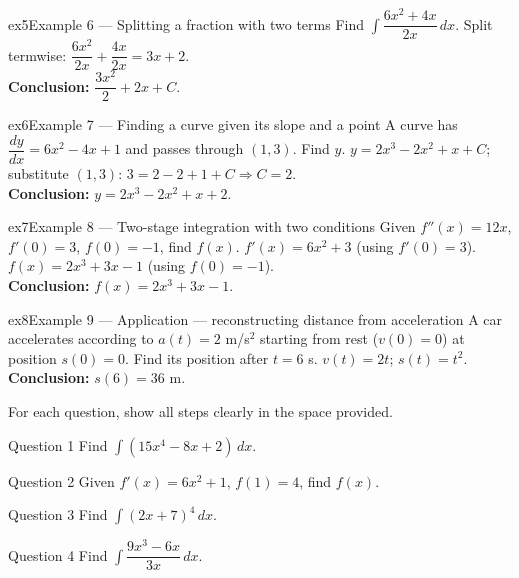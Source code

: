 \documentclass[11pt]{article}
\begin{document}
\begin{example}{ex5}{Example 6 --- Splitting a fraction with two terms}
Find $\displaystyle\int\dfrac{6x^2+4x}{2x}\,dx$.\soln
Split termwise: $\dfrac{6x^2}{2x}+\dfrac{4x}{2x}=3x+2$.\\[3pt]\textbf{Conclusion:} $\dfrac{3x^2}2+2x+C$.
\end{example}

\begin{example}{ex6}{Example 7 --- Finding a curve given its slope and a point}
A curve has $\dfrac{dy}{dx}=6x^2-4x+1$ and passes through $(1,3)$. Find $y$.\soln
$y=2x^3-2x^2+x+C$; substitute $(1,3)$: $3=2-2+1+C\Rightarrow C=2$.\\[3pt]\textbf{Conclusion:} $y=2x^3-2x^2+x+2$.
\end{example}

\begin{example}{ex7}{Example 8 --- Two-stage integration with two conditions}
Given $f''(x)=12x$, $f'(0)=3$, $f(0)=-1$, find $f(x)$.\soln
$f'(x)=6x^2+3$ (using $f'(0)=3$). $f(x)=2x^3+3x-1$ (using $f(0)=-1$).\\[3pt]\textbf{Conclusion:} $f(x)=2x^3+3x-1$.
\end{example}

\begin{example}{ex8}{Example 9 --- Application --- reconstructing distance from acceleration}
A car accelerates according to $a(t)=2$ m/s$^2$ starting from rest ($v(0)=0$) at position $s(0)=0$. Find its position after $t=6$ s.\soln
$v(t)=2t$; $s(t)=t^2$.\\[3pt]\textbf{Conclusion:} $s(6)=36$ m.
\end{example}

\clearpage
{}
For each question, show all steps clearly in the space provided.

\begin{qbox}{Question 1}
Find $\displaystyle\int(15x^4-8x+2)\,dx$.\workspace{2.4cm}
\end{qbox}

\begin{qbox}{Question 2}
Given $f'(x)=6x^2+1$, $f(1)=4$, find $f(x)$.\workspace{2.4cm}
\end{qbox}

\begin{qbox}{Question 3}
Find $\displaystyle\int(2x+7)^4\,dx$.\workspace{2.4cm}
\end{qbox}

\begin{qbox}{Question 4}
Find $\displaystyle\int\dfrac{9x^3-6x}{3x}\,dx$.\workspace{2.4cm}
\end{qbox}
\end{document}
